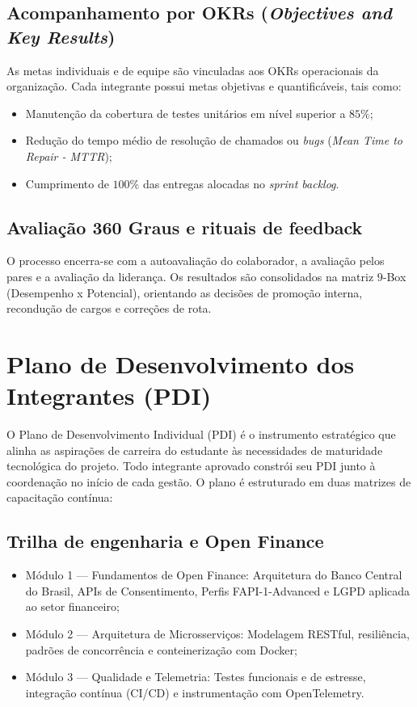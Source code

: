\documentclass[
  12pt,
  openright,
  oneside,
  a4paper,
  brazilian
]{abntex2}
\newcommand{\bcb}{Banco Central do Brasil}
\begin{document}
\subsection{Acompanhamento por OKRs (\textit{Objectives and Key Results})}
As metas individuais e de equipe são vinculadas aos OKRs operacionais da organização. Cada integrante possui metas objetivas e quantificáveis, tais como:
\begin{itemize}
    \item Manutenção da cobertura de testes unitários em nível superior a $85\%$;
    \item Redução do tempo médio de resolução de chamados ou \textit{bugs} (\textit{Mean Time to Repair - MTTR});
    \item Cumprimento de $100\%$ das entregas alocadas no \textit{sprint backlog}.
\end{itemize}

\subsection{Avaliação 360 Graus e rituais de feedback}
O processo encerra-se com a autoavaliação do colaborador, a avaliação pelos pares e a avaliação da liderança. Os resultados são consolidados na matriz $9$-Box (Desempenho x Potencial), orientando as decisões de promoção interna, recondução de cargos e correções de rota.

\section{Plano de Desenvolvimento dos Integrantes (PDI)}
\label{sec:plano_desenvolvimento}

O Plano de Desenvolvimento Individual (PDI) é o instrumento estratégico que alinha as aspirações de carreira do estudante às necessidades de maturidade tecnológica do projeto. Todo integrante aprovado constrói seu PDI junto à coordenação no início de cada gestão. O plano é estruturado em duas matrizes de capacitação contínua:

\subsection{Trilha de engenharia e Open Finance}
\begin{itemize}
    \item{Módulo 1 — Fundamentos de Open Finance:} Arquitetura do \bcb{}, APIs de Consentimento, Perfis FAPI-1-Advanced e LGPD aplicada ao setor financeiro;
    \item{Módulo 2 — Arquitetura de Microsserviços:} Modelagem RESTful, resiliência, padrões de concorrência e conteinerização com Docker;
    \item{Módulo 3 — Qualidade e Telemetria:} Testes funcionais e de estresse, integração contínua (CI/CD) e instrumentação com OpenTelemetry.
\end{itemize}
\end{document}
